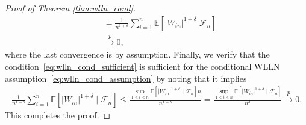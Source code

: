 \documentclass[12pt]{article}
\theoremstyle{definition}
\theoremstyle{remark}
\newcommand{\E}{\mathbb E}								%
\newcommand{\convp}{\overset p \rightarrow}             %
\begin{document}
\begin{proof}[Proof of Theorem \ref{thm:wlln_cond}]
\begin{align*}
			&
			=\frac{1}{{n^{1+\delta}}}\sum_{i=1}^n\E[|W_{in}|^{1+\delta}|\mathcal{F}_n]\\
			&
			\convp0,
		\end{align*}
		where the last convergence is by assumption. Finally, we verify that the condition~\eqref{eq:wlln_cond_sufficient} is sufficient for the conditional WLLN assumption~\eqref{eq:wlln_cond_assumption} by noting that it implies
		\begin{align*}
			\frac{1}{n^{1+\delta}} \sum_{i = 1}^n \E[|W_{in}|^{1+\delta} \mid \mathcal{F}_n]\leq \frac{\sup_{1\leq i\leq n}\E[|W_{in}|^{1+\delta} \mid \mathcal{F}_n]n}{n^{1+\delta}}=\frac{\sup_{1\leq i\leq n}\E[|W_{in}|^{1+\delta} \mid \mathcal{F}_n]}{n^{\delta}} \convp 0.
		\end{align*}
		This completes the proof.
	\end{proof}
	
\end{document}
